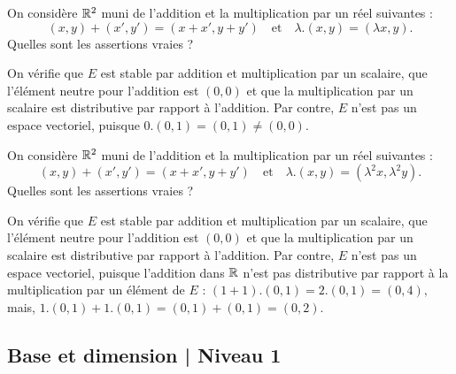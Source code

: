 \begin{question}
On considère $\mathbb{R}^2$ muni de l'addition et la multiplication par un réel suivantes :
$$(x,y) +  (x',y') = (x+x',y+y')\quad \mbox{et}\quad \lambda .(x,y) = (\lambda x, y).$$
Quelles sont les assertions vraies ?
\begin{answers}
\end{answers}
\begin{explanations} On vérifie que $E$ est stable par addition et multiplication par un scalaire, que l'élément neutre 
pour l'addition est $(0,0)$ et que la multiplication par un scalaire est distributive par rapport à l'addition. Par contre, $E$ n'est pas un espace vectoriel, puisque  $0.(0,1) = (0,1) \neq (0,0)$.
\end{explanations}
\end{question}


\begin{question}
On considère $\mathbb{R}^2$ muni de l'addition et la multiplication par un réel suivantes :
$$(x,y) +  (x',y') = (x+x',y+y')\quad \mbox{et}\quad \lambda .(x,y) = (\lambda^2 x, \lambda^2 y).$$
Quelles sont les assertions vraies ?
\begin{answers}  
\end{answers}
\begin{explanations} On vérifie que $E$ est stable par addition et multiplication par un scalaire, que l'élément neutre 
pour l'addition est $(0,0)$ et que la multiplication par un scalaire est distributive par rapport à l'addition. Par contre, $E$ n'est pas un espace vectoriel, puisque l'addition dans $\mathbb{R}$ n'est pas distributive par rapport à la multiplication par un élément de $E$ : 
$(1+1).(0,1) = 2.(0,1) = (0,4),$ mais, $1.(0,1)+1.(0,1) = (0,1)+(0,1) = (0,2)$.
\end{explanations}
\end{question}

\subsection{Base et dimension | Niveau 1}


